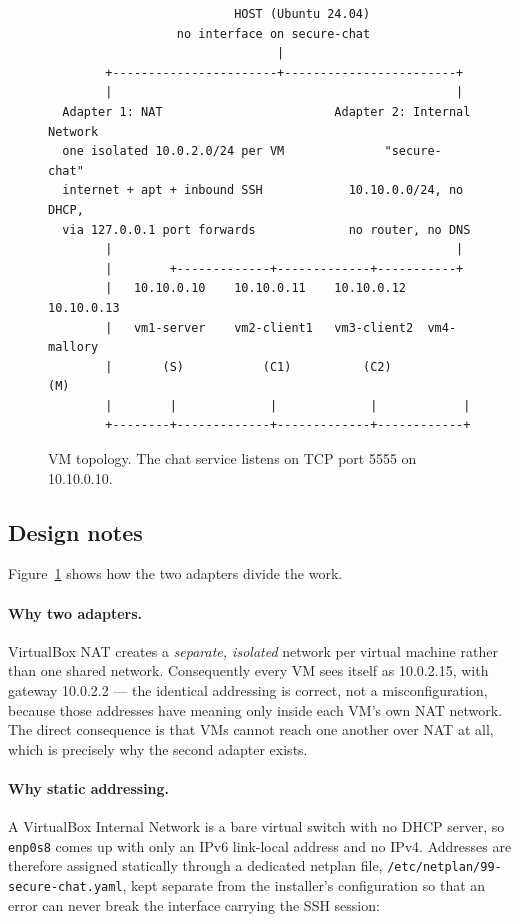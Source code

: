\documentclass[11pt,a4paper]{article}
\begin{document}
\begin{figure}[htbp]
\centering
\begin{minipage}{0.95\textwidth}
\begin{lstlisting}
                          HOST (Ubuntu 24.04)
                  no interface on secure-chat
                                |
        +-----------------------+------------------------+
        |                                                |
  Adapter 1: NAT                        Adapter 2: Internal Network
  one isolated 10.0.2.0/24 per VM              "secure-chat"
  internet + apt + inbound SSH            10.10.0.0/24, no DHCP,
  via 127.0.0.1 port forwards             no router, no DNS
        |                                                |
        |        +-------------+-------------+-----------+
        |   10.10.0.10    10.10.0.11    10.10.0.12   10.10.0.13
        |   vm1-server    vm2-client1   vm3-client2  vm4-mallory
        |       (S)           (C1)          (C2)         (M)
        |        |             |             |            |
        +--------+-------------+-------------+------------+
\end{lstlisting}
\end{minipage}
\caption{VM topology. The chat service listens on TCP port 5555 on 10.10.0.10.}
\label{fig:topology}
\end{figure}

\subsection{Design notes}

Figure~\ref{fig:topology} shows how the two adapters divide the work.

\paragraph{Why two adapters.} VirtualBox NAT creates a \emph{separate, isolated} network per virtual
machine rather than one shared network. Consequently every VM sees itself as 10.0.2.15, with gateway
10.0.2.2 --- the identical addressing is correct, not a misconfiguration, because those addresses
have meaning only inside each VM's own NAT network. The direct consequence is that VMs cannot reach
one another over NAT at all, which is precisely why the second adapter exists.

\paragraph{Why static addressing.} A VirtualBox Internal Network is a bare virtual switch with no
DHCP server, so \texttt{enp0s8} comes up with only an IPv6 link-local address and no IPv4. Addresses
are therefore assigned statically through a dedicated netplan file,
\texttt{/etc/netplan/99-secure-chat.yaml}, kept separate from the installer's configuration so that
an error can never break the interface carrying the SSH session:
\end{document}
